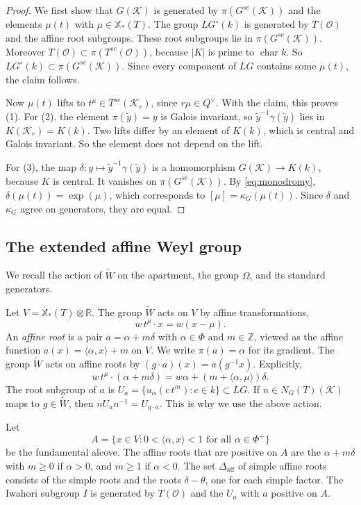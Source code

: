 \documentclass[psamsfonts]{amsart}
\theoremstyle{definition}
\theoremstyle{remark}
\numberwithin{equation}{section}
\newcommand{\Z}{\mathbb{Z}}   %
\newcommand{\X}{\mathbb{X}}
\newcommand{\extw}{\widetilde{W}}
\newcommand{\ra}{\rightarrow}
\DeclareMathOperator{\aff}{aff}
\DeclareMathOperator{\chara}{char}
\newcommand\cK{\mathcal{K}}
\newcommand\cO{\mathcal{O}}
\newcommand{\RR}{\mathbb{R}}
\numberwithin{equation}{section}
\newcommand{\Om}{\Omega}
\newcommand{\Daff}{\Delta_{\aff}}
\theoremstyle{plain}
\begin{document}
\begin{proof}
We first show that $G(\cK)$ is generated by $\pi(G^{sc}(\cK))$ and the elements $\mu(t)$ with $\mu\in\X_*(T)$. The group $LG^\circ(k)$ is generated by $T(\cO)$ and the affine root subgroups. These root subgroups lie in $\pi(G^{sc}(\cK))$. Moreover $T(\cO)\subset\pi(T^{sc}(\cO))$, because $|K|$ is prime to $\chara k$. So $LG^\circ(k)\subset\pi(G^{sc}(\cK))$. Since every component of $LG$ contains some $\mu(t)$, the claim follows.

Now $\mu(t)$ lifts to $t^\mu\in T^{sc}(\cK_r)$, since $r\mu\in Q^\vee$. With the claim, this proves (1). For (2), the element $\pi(\tilde y)=y$ is Galois invariant, so $\tilde y^{-1}\gamma(\tilde y)$ lies in $K(\cK_r)=K(k)$. Two lifts differ by an element of $K(k)$, which is central and Galois invariant. So the element does not depend on the lift.

For (3), the map $\delta\colon y\mapsto\tilde y^{-1}\gamma(\tilde y)$ is a homomorphism $G(\cK)\ra K(k)$, because $K$ is central. It vanishes on $\pi(G^{sc}(\cK))$. By \eqref{eq:monodromy}, $\delta(\mu(t))=\exp(\mu)$, which corresponds to $[\mu]=\kappa_G(\mu(t))$. Since $\delta$ and $\kappa_G$ agree on generators, they are equal.
\end{proof}


\subsection{The extended affine Weyl group}\label{subsec:W}
We recall the action of $\extw$ on the apartment, the group $\Om$, and its standard generators.

Let $V=\X_*(T)\otimes\RR$. The group $\extw$ acts on $V$ by affine transformations,
\[
w\,t^{\mu}\cdot x=w(x-\mu).
\]
An \emph{affine root} is a pair $a=\alpha+m\delta$ with $\alpha\in\Phi$ and $m\in\Z$, viewed as the affine function $a(x)=\langle\alpha,x\rangle+m$ on $V$. We write $\pi(a)=\alpha$ for its gradient. The group $\extw$ acts on affine roots by $(g\cdot a)(x)=a(g^{-1}x)$. Explicitly,
\[
w\,t^{\mu}\cdot(\alpha+m\delta)=w\alpha+(m+\langle\alpha,\mu\rangle)\delta.
\]
The root subgroup of $a$ is $U_a=\{u_\alpha(c\,t^m):c\in k\}\subset LG$. If $n\in N_G(T)(\cK)$ maps to $g\in\extw$, then $nU_an^{-1}=U_{g\cdot a}$. This is why we use the above action.

Let
\[
A=\{x\in V:0<\langle\alpha,x\rangle<1\text{ for all }\alpha\in\Phi^+\}
\]
be the fundamental alcove. The affine roots that are positive on $A$ are the $\alpha+m\delta$ with $m\geq0$ if $\alpha>0$, and $m\geq1$ if $\alpha<0$. The set $\Daff$ of simple affine roots consists of the simple roots and the roots $\delta-\theta$, one for each simple factor. The Iwahori subgroup $I$ is generated by $T(\cO)$ and the $U_a$ with $a$ positive on $A$.
\end{document}
